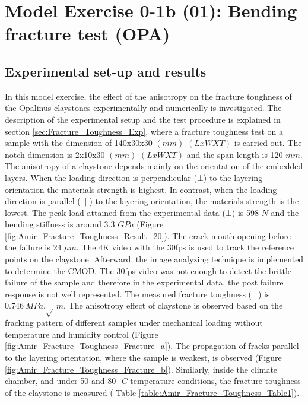 \section{Model Exercise 0-1b (01): Bending fracture test (OPA)}
\label{sec:mex01b}

\subsection{Experimental set-up and results}

In this model exercise, the effect of the anisotropy on the fracture toughness of the Opalinus claystones experimentally and numerically is investigated. The description of the experimental setup and the test procedure is explained in section \ref{sec:Fracture_Toughness_Exp}, where a fracture toughness test on a sample with the dimension of 140x30x30 $(mm)$ $(LxWXT)$ is carried out. The notch dimension is 2x10x30 $(mm)$ $(LxWXT)$ and the span length is 120 $mm$. The anisotropy of a claystone depends mainly on the orientation of the embedded layers. When the loading direction is perpendicular ($\bot$) to the layering orientation the materials strength is highest. In contrast, when the loading direction is parallel ($\parallel$) to the layering orientation, the materials strength is the lowest. The peak load attained from the experimental data ($\bot$) is 598 $N$ and the bending stiffness is around 3.3 $GPa$ (Figure \ref{fig:Amir_Fracture_Toughness_Result_20}). The crack mouth opening before the failure is 24 $\mu m$. The 4K video with the 30fps is used to track the reference points on the claystone. Afterward, the image analyzing technique is implemented to determine the CMOD. The 30fps video was not enough to detect the brittle failure of the sample and therefore in the experimental data, the post failure response is not well represented. The measured fracture toughness ($\bot$) is $0.746\ MPa.\sqrt\ m$. The anisotropy effect of claystone is observed based on the fracking pattern of different samples under mechanical loading without temperature and humidity control (Figure \ref{fig:Amir_Fracture_Toughness_Fracture_a}). The propagation of fracks parallel to the layering orientation, where the sample is weakest, is observed (Figure \ref{fig:Amir_Fracture_Toughness_Fracture_b}). Similarly, inside the climate chamber, and under 50 and 80 $^{\circ}C$ temperature conditions, the fracture toughness of the claystone is measured ( Table \ref{table:Amir_Fracture_Toughness_Table1}).


